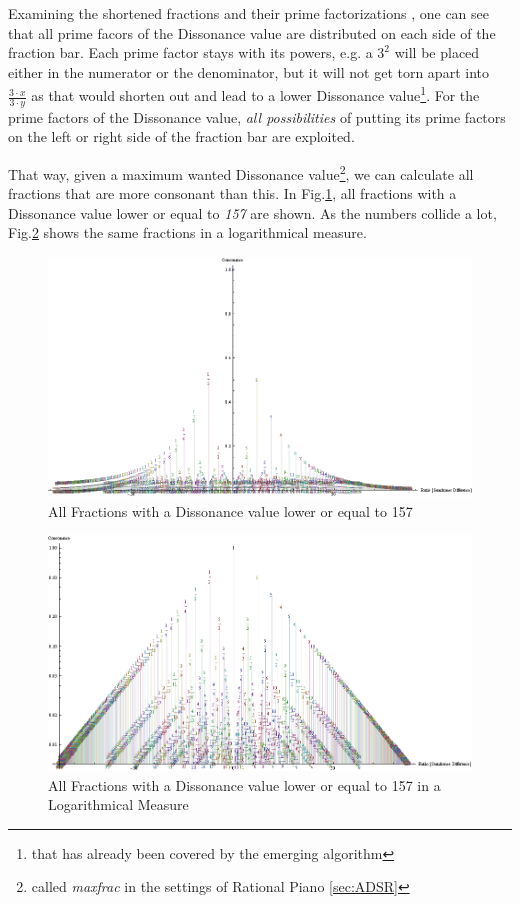 \documentclass[12pt,a4paper,titlepage,oneside]{report}
\begin{document}
Examining the shortened fractions and their prime factorizations \cite{bib:factorization}, one can see that all prime facors of the Dissonance value are distributed on each side of the fraction bar. Each prime factor stays with its powers, e.g. a $3^2$ will be placed either in the numerator or the denominator, but it will not get torn apart into $\frac{3 \cdot x}{3 \cdot y}$ as that would shorten out and lead to a lower Dissonance value\footnote{that has already been covered by the emerging algorithm}. For the prime factors of the Dissonance value, \textit{all possibilities} of putting its prime factors on the left or right side of the fraction bar are exploited.

That way, given a maximum wanted Dissonance value\footnote{called \textit{maxfrac} in the settings of Rational Piano \ref{sec:ADSR}}, we can calculate all fractions that are more consonant than this. In Fig.\ref{fig:maxfrac_fractions}, all fractions with a Dissonance value lower or equal to \textit{157} are shown. As the numbers collide a lot, Fig.\ref{fig:maxfrac_fractions_log} shows the same fractions in a logarithmical measure.

\begin{figure}[!ht]
\includegraphics[width=\textwidth]{images/maxfrac_fractions.png}
\centering
\caption{All Fractions with a Dissonance value lower or equal to 157}
\label{fig:maxfrac_fractions}
\end{figure}

\begin{figure}[!ht]
\includegraphics[width=\textwidth]{images/maxfrac_fractions_log.png}
\centering
\caption{All Fractions with a Dissonance value lower or equal to 157 in a Logarithmical Measure}
\label{fig:maxfrac_fractions_log}
\end{figure}
\end{document}
